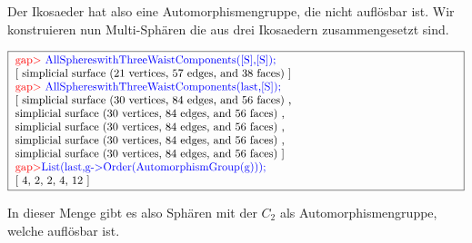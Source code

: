 \documentclass[12pt,titlepage,twoside,cleardoublepage]{article}
\theoremstyle{nummermitklammern}
\numberwithin{equation}{section}
\begin{document}
Der Ikosaeder hat also eine Automorphismengruppe, die nicht auflösbar ist. Wir konstruieren nun Multi-Sphären die aus drei Ikosaedern zusammengesetzt sind.
\begin{center}
$\fbox{
\parbox{14cm}{
\textcolor{red}{gap$>$} \textcolor{blue}{AllSphereswithThreeWaistComponents([S],[S]);}\newline
[ simplicial surface (21 vertices, 57 edges, and 38 faces)
 ]\newline
\textcolor{red}{gap$>$} \textcolor{blue}{AllSphereswithThreeWaistComponents(last,[S]);}\newline
[ simplicial surface (30 vertices, 84 edges, and 56 faces)
    ,\newline simplicial surface (30 vertices, 84 edges, and 56 faces)
    , \newline simplicial surface (30 vertices, 84 edges, and 56 faces)
    ,\newline simplicial surface (30 vertices, 84 edges, and 56 faces)
    ,\newline
  simplicial surface (30 vertices, 84 edges, and 56 faces)
 ]\newline
\textcolor{red}{gap$>$}\textcolor{blue}{ List(last,g-$>$Order(AutomorphismGroup(g)));}\newline
[ 4, 2, 2, 4, 12 ]
}}$
\end{center}
In dieser Menge gibt es also Sphären mit der $C_2$ als Automorphismengruppe, welche auflösbar ist.
\end{document}
